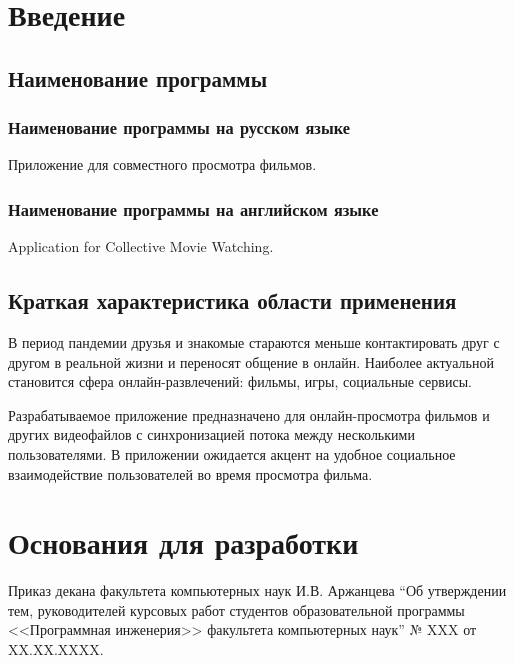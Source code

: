 \section{Введение}

\subsection{Наименование программы}

\subsubsection{Наименование программы на русском языке}

Приложение для совместного просмотра фильмов.

\subsubsection{Наименование программы на английском языке}

Application for Collective Movie Watching.

\subsection{Краткая характеристика области применения}

В период пандемии друзья и знакомые стараются меньше контактировать друг с другом в реальной жизни и переносят общение в онлайн.
Наиболее актуальной становится сфера онлайн-развлечений: фильмы, игры, социальные сервисы.

Разрабатываемое приложение предназначено для онлайн-просмотра фильмов и других видеофайлов с синхронизацией потока
между несколькими пользователями.
В приложении ожидается акцент на удобное социальное взаимодействие пользователей во время просмотра фильма.


\section{Основания для разработки}

Приказ декана факультета компьютерных наук И.В. Аржанцева ``Об утверждении тем, руководителей курсовых работ студентов
образовательной программы <<Программная инженерия>> факультета компьютерных наук'' № XXX от XX.XX.XXXX.
